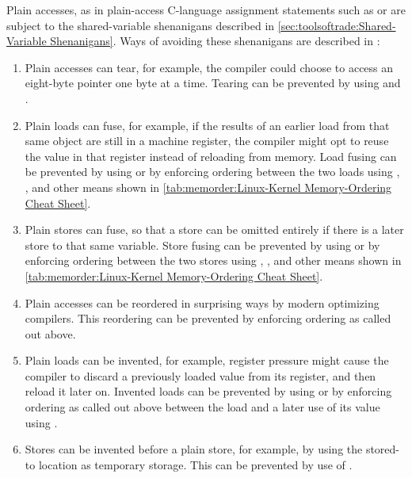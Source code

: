 Plain accesses, as in plain-access C-language assignment statements such
as  or  are subject to the
shared-variable shenanigans described in
\cref{sec:toolsoftrade:Shared-Variable Shenanigans}.
Ways of avoiding these shenanigans are described in
:

\begin{enumerate}
\item	Plain accesses can tear, for example, the compiler could choose
	to access an eight-byte pointer one byte at a time.
	Tearing can be prevented by using  and
	.
\item	Plain loads can fuse, for example, if the results of an earlier
	load from that same object are still in a machine register,
	the compiler might opt to reuse the value in that register
	instead of reloading from memory.
	Load fusing can be prevented by using  or by
	enforcing ordering between the two loads using ,
	, and other means shown in
	\cref{tab:memorder:Linux-Kernel Memory-Ordering Cheat Sheet}.
\item	Plain stores can fuse, so that a store can be omitted entirely
	if there is a later store to that same variable.
	Store fusing can be prevented by using  or by
	enforcing ordering between the two stores using ,
	, and other means shown in
	\cref{tab:memorder:Linux-Kernel Memory-Ordering Cheat Sheet}.
\item	Plain accesses can be reordered in surprising ways by modern
	optimizing compilers.
	This reordering can be prevented by enforcing ordering as
	called out above.
\item	Plain loads can be invented, for example, register pressure might
	cause the compiler to discard a previously loaded value from
	its register, and then reload it later on.
	Invented loads can be prevented by using  or by
	enforcing ordering as called out above between the load and a
	later use of its value using .
\item	Stores can be invented before a plain store, for example, by
	using the stored-to location as temporary storage.
	This can be prevented by use of .
\end{enumerate}

\QuickQuizEnd

